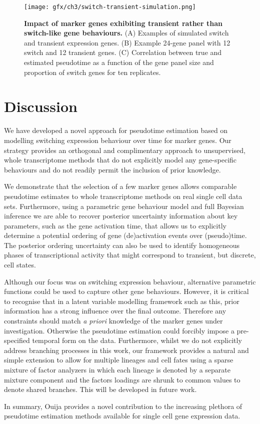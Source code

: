 \begin{figure}
	\texttt{[image: gfx/ch3/switch-transient-simulation.png]}
	\caption{{\bf Impact of marker genes exhibiting transient rather than switch-like gene behaviours.} (A) Examples of simulated switch and transient expression genes. (B) Example 24-gene panel with 12 switch and 12 transient genes. (C) Correlation between true and estimated pseudotime as a function of the gene panel size and proportion of switch genes for ten replicates.}
	\label{fig:switch-transient-simulation}
\end{figure}

\section{Discussion}

We have developed a novel approach for pseudotime estimation based on modelling switching expression behaviour over time for marker genes. Our strategy provides an orthogonal and complimentary approach to unsupervised, whole transcriptome methods that do not explicitly model any gene-specific behaviours and do not readily permit the inclusion of prior knowledge.

We demonstrate that the selection of a few marker genes allows comparable pseudotime estimates to whole transcriptome methods on real single cell data sets. Furthermore, using a parametric gene behaviour model and full Bayesian inference we are able to recover posterior uncertainty information about key parameters, such as the gene activation time, that allows us to explicitly determine a potential ordering of gene (de)activation events over (pseudo)time. The posterior ordering uncertainty can also be used to identify homogeneous phases of transcriptional activity that might correspond to transient, but discrete, cell states.

Although our focus was on switching expression behaviour, alternative parametric functions could be used to capture other gene behaviours. However, it is critical to recognise that in a latent variable modelling framework such as this, prior information has a strong influence over the final outcome. Therefore any constraints should match \emph{a priori} knowledge of the marker genes under investigation. Otherwise the pseudotime estimation could forcibly impose a pre-specified temporal form on the data. Furthermore, whilst we do not explicitly address branching processes in this work, our framework provides a natural and simple extension to allow for multiple lineages and cell fates using a sparse mixture of factor analyzers in which each lineage is denoted by a separate mixture component and the factors loadings are shrunk to common values to denote shared branches. This will be developed in future work.

In summary, Ouija provides a novel contribution to the increasing plethora of pseudotime estimation methods available for single cell gene expression data.
